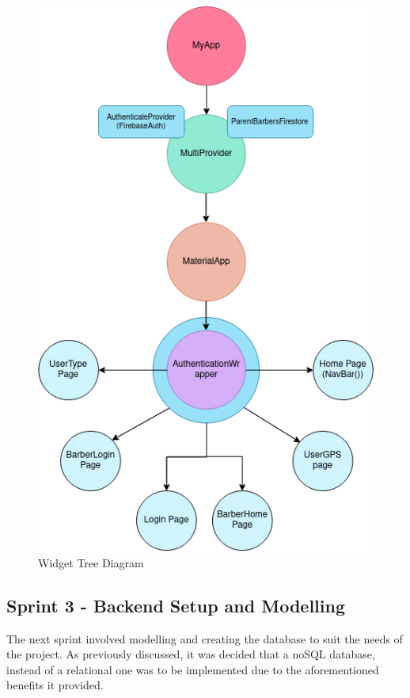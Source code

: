 \documentclass[12pt]{article}
\begin{document}
		
	\begin{figure}[H]
		\centering
		\includegraphics[scale=0.55]{images/widget-tree.png}
		\caption{Widget Tree Diagram}
		\label{fig:widget-tree}
	\end{figure}
	
	


	
	
	\subsection{Sprint 3 - Backend Setup and Modelling}
	The next sprint involved modelling and creating the database to suit the needs of the project. As previously discussed, it was decided that a noSQL database, instead of a relational one was to be implemented due to the aforementioned benefits it provided.
	
\end{document}

